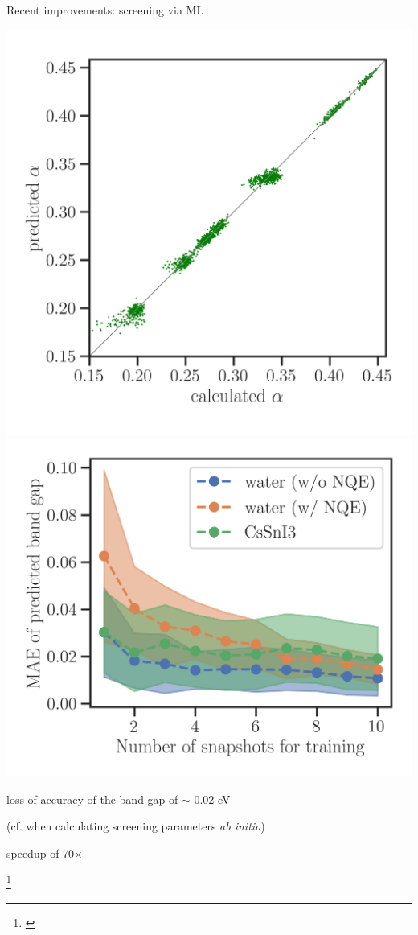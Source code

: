 \documentclass[xcolor=table,aspectratio=169]{beamer}
\newcommand\blfootcite[1]{%
  \begingroup
  \renewcommand\thefootnote{}\footnote{\hspace{-4ex}\cite{#1}}%
  \addtocounter{footnote}{-1}%
  \endgroup
}
\numberwithin{equation}{section}
\begin{document}
\begin{frame}{Recent improvements: screening via ML}
   \begin{center}

      \includegraphics[height=0.7\paperheight]{figures/CsSnI3_calc_vs_pred_Edward.png}
      \includegraphics[height=0.7\paperheight]{figures/convergence_analysis_Edward.png}

      loss of accuracy of the band gap of $\sim$ 0.02 eV

      (cf. when calculating screening parameters \emph{ab initio})

      speedup of 70$\times$
   \end{center}

   \blfootcite{Schubert2022}

\end{frame}
\end{document}
